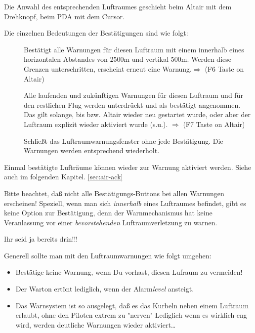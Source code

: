  Die Anwahl des entsprechenden Luftraumes geschieht beim Altair mit dem Drehknopf, beim PDA mit dem Cursor.

Die einzelnen Bedeutungen der Bestätigungen sind wie folgt:

\begin{description}

\item[]  Bestätigt alle Warnungen für diesen Luftraum mit einem
innerhalb eines horizontalen Abstandes von 2500m und vertikal 500m.
Werden diese  Grenzen unterschritten, erscheint erneut eine Warnung.$\Rightarrow$  (F6 Taste on Altair)

\item[]  Alle laufenden und zukünftigen Warnungen für diesen Luftraum
und für den restlichen Flug werden unterdrückt und als bestätigt angenommen.
Das gilt solange, bis \xc bzw. Altair  wieder neu gestartet wurde, oder aber der
Luftraum explizit wieder aktiviert wurde (s.u.). $\Rightarrow$  (F7 Taste on Altair)

\item[] Schließt das Luftraumwarnungsfenster ohne jede Bestätigung.
Die Warnungen werden entsprechend wiederholt.
\end{description}

Einmal bestätigte Lufträume können  wieder zur Warnung aktiviert werden.  Siehe auch im folgenden Kapitel. \ref{sec:air-ack}

 Bitte beachtet, daß nicht alle Bestätigungs-Buttons bei allen Warnungen erscheinen!
Speziell, wenn man sich \textsl{innerhalb} eines Luftraumes befindet, gibt es keine Option
zur Bestätigung, denn der Warnmechanismus hat keine Veranlassung vor einer \textsl{bevorstehenden} Luftraumverletzung zu warnen.

Ihr seid ja bereits drin!!!

Generell sollte man mit den Luftraumwarnungen wie folgt umgehen:
\begin{itemize}
\item Bestätige keine Warnung, wenn Du vorhast, diesen Lufraum zu vermeiden!
\item Der Warton ertönt lediglich, wenn der Alarm\textsl{level} ansteigt.
\item Das Warnsystem ist so ausgelegt, daß es das Kurbeln neben einem Luftraum erlaubt,
ohne den Piloten extrem zu "nerven" Lediglich wenn es wirklich eng wird, werden
deutliche Warnungen wieder aktiviert\dots
\end{itemize}

